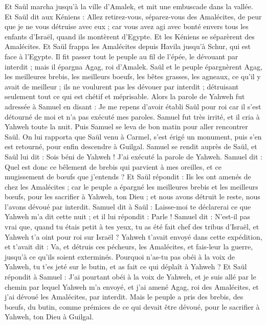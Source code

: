 \begin{multicols}{2}
Et Saül marcha jusqu'à la ville d’Amalek, et mit une embuscade dans la vallée.
Et Saül dit aux Kéniens : Allez retirez-vous, séparez-vous des Amalécites, de peur que je ne vous détruise avec eux ; car vous avez agi avec bonté envers tous les enfants d'Israël, quand ils montèrent d'Egypte. Et les Kéniens se séparèrent des Amalécites.
Et Saül frappa les Amalécites depuis Havila jusqu'à Schur, qui est face à l'Egypte.
Il fit passer tout le peuple au fil de l'épée, le dévouant par interdit ; mais il épargna Agag, roi d'Amalek.
Saül et le peuple épargnèrent Agag, les meilleures brebis, les meilleurs boeufs, les bêtes grasses, les agneaux, ce qu’il y avait de meilleur ; ils ne voulurent pas les dévouer par interdit ; détruisant seulement tout ce qui est chétif et méprisable.
Alors la parole de Yahweh fut adressée à Samuel en disant :
Je me repens d'avoir établi Saül pour roi car il s’est détourné de moi et n'a pas exécuté mes paroles. Samuel fut très irrité, et il cria à Yahweh toute la nuit.
Puis Samuel se leva de bon matin pour aller rencontrer Saül. On lui rapporta que Saül venu à Carmel, s'est érigé un monument, puis s'en est retourné, pour enfin descendre à Guilgal.
Samuel se rendit auprès de Saül, et Saül lui dit : Sois béni de Yahweh ! J’ai exécuté la parole de Yahweh.
Samuel dit : Quel est donc ce bêlement de brebis qui parvient à mes oreilles, et ce mugissement de bœufs que j'entends ?
Et Saül répondit : Ils les ont amenés de chez les Amalécites ; car le peuple a épargné les meilleures brebis et les meilleurs bœufs, pour les sacrifier à Yahweh, ton Dieu ; et nous avons détruit le reste, nous l’avons dévoué par interdit.
Samuel dit à Saül : Laisse-moi te déclarerai ce que Yahweh m'a dit cette nuit ; et il lui répondit : Parle !
Samuel dit : N'est-il pas vrai que, quand tu étais petit à tes yeux, tu as été fait chef des tribus d'Israël, et Yahweh t'a oint pour roi sur Israël ?
Yahweh t'avait envoyé dans cette expédition, et t'avait dit : Va, et détruis ces pécheurs, les Amalécites, et fais-leur la guerre, jusqu'à ce qu'ils soient exterminés.
Pourquoi n'as-tu pas obéi à la voix de Yahweh, tu t'es jeté sur le butin, et as fait ce qui déplaît à Yahweh ?
Et Saül répondit à Samuel : J'ai pourtant obéi à la voix de Yahweh, et je suis allé par le chemin par lequel Yahweh m'a envoyé, et j'ai amené Agag, roi des Amalécites, et j'ai dévoué les Amalécites, par interdit.
Mais le peuple a pris des brebis, des bœufs, du butin, comme prémices de ce qui devait être dévoué, pour le sacrifier à Yahweh, ton Dieu à Guilgal.

\end{multicols}
